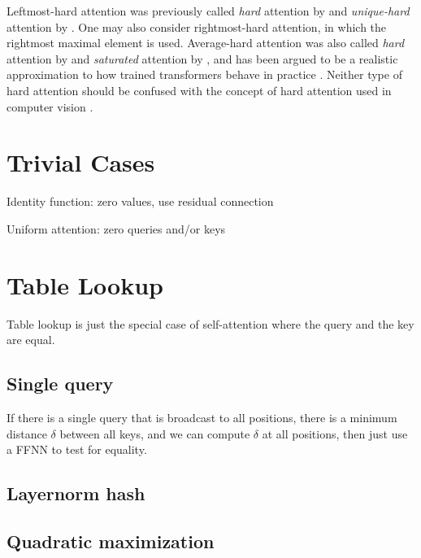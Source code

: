 Leftmost-hard attention was previously called 
\emph{hard} attention by \citet{hahn-2020-theoretical} and
\emph{unique-hard} attention by \citet{hao-etal-2022-circuits}.
One may also consider rightmost-hard attention, in which the rightmost maximal element is used.
Average-hard attention was also called 
\emph{hard} attention by \citet{perez-etal-2021-turing} and
\emph{saturated} attention by \citet{merrill-etal-2021-saturated-transformers}, and has been argued to be a realistic approximation to how trained transformers behave in practice \citep{merrill-etal-2021-effects}.
Neither type of hard attention should be confused with the concept of hard attention used in computer vision \citep[e.g.,][]{xu+:2015}.

\section{Trivial Cases}

Identity function: zero values, use residual connection

Uniform attention: zero queries and/or keys

\section{Table Lookup}

Table lookup is just the special case of self-attention where the query and the key are equal.

\subsection{Single query}

If there is a single query that is broadcast to all positions, 
there is a minimum distance $\delta$ between all keys, and we can compute $\delta$ at all positions,
then just use a FFNN to test for equality.

\citep{chiang-cholak-2022-parity}

\subsection{Layernorm hash}

\citep{merrill-sabharwal-2024-cot}

\subsection{Quadratic maximization}

